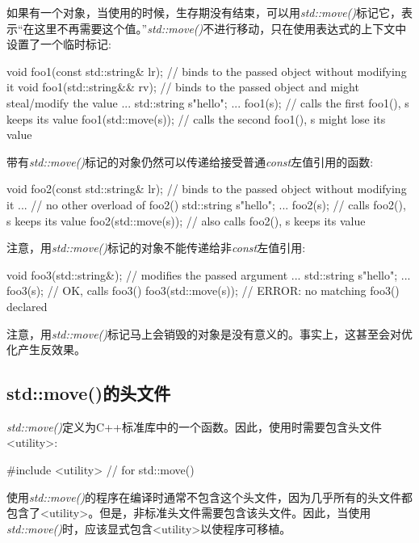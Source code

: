 如果有一个对象，当使用的时候，生存期没有结束，可以用\textit{std::move()}标记它，表示“在这里不再需要这个值。”\textit{std::move()}不进行移动，只在使用表达式的上下文中设置了一个临时标记:

\begin{cppcode}
void foo1(const std::string& lr); // binds to the passed object without modifying it
void foo1(std::string&& rv); // binds to the passed object and might steal/modify the value
...
std::string s{"hello"};
...
foo1(s); // calls the first foo1(), s keeps its value
foo1(std::move(s)); // calls the second foo1(), s might lose its value
\end{cppcode}

带有\textit{std::move()}标记的对象仍然可以传递给接受普通\textit{const}左值引用的函数:

\begin{cppcode}
void foo2(const std::string& lr); // binds to the passed object without modifying it
... // no other overload of foo2()
std::string s{"hello"};
...
foo2(s); // calls foo2(), s keeps its value
foo2(std::move(s)); // also calls foo2(), s keeps its value
\end{cppcode}

注意，用\textit{std::move()}标记的对象不能传递给非\textit{const}左值引用:

\begin{cppcode}
void foo3(std::string&); // modifies the passed argument
...
std::string s{"hello"};
...
foo3(s); // OK, calls foo3()
foo3(std::move(s)); // ERROR: no matching foo3() declared
\end{cppcode}

注意，用\textit{std::move()}标记马上会销毁的对象是没有意义的。事实上，这甚至会对优化产生反效果。

\subsection{std::move()的头文件}

\textit{std::move()}定义为C++标准库中的一个函数。因此，使用时需要包含头文件<utility>:

\begin{cppcode}
#include <utility> // for std::move()
\end{cppcode}

使用\textit{std::move()}的程序在编译时通常不包含这个头文件，因为几乎所有的头文件都包含了<utility>。但是，非标准头文件需要包含该头文件。因此，当使用\textit{std::move()}时，应该显式包含<utility>以使程序可移植。

